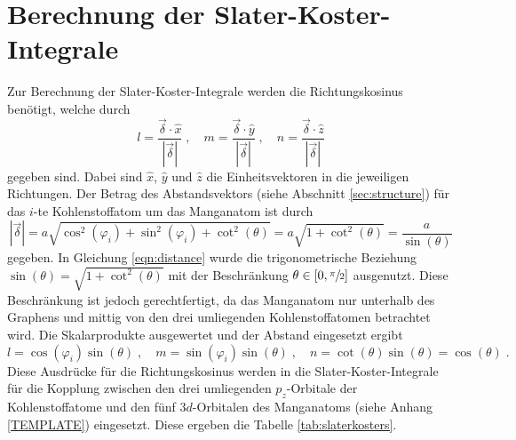 \section{Berechnung der Slater-Koster-Integrale}
\label{sec:slaterkostercalc}
Zur Berechnung der Slater-Koster-Integrale werden die Richtungskosinus benötigt, welche durch
\begin{equation*}
    l = \frac{\vec{\delta} \cdot \hat{x}}{\left | \vec{\delta} \right |} \; , \quad
    m = \frac{\vec{\delta} \cdot \hat{y}}{\left | \vec{\delta} \right |} \; , \quad
    n = \frac{\vec{\delta} \cdot \hat{z}}{\left | \vec{\delta} \right |}
\end{equation*}
gegeben sind.
Dabei sind $\hat{x}$, $\hat{y}$ und $\hat{z}$ die Einheitsvektoren in die jeweiligen Richtungen. 
Der Betrag des Abstandsvektors (siehe Abschnitt \ref{sec:structure}) für das $i$-te Kohlenstoffatom um das Manganatom ist durch 
\begin{equation}
    \left | \vec{\delta} \right | = a \sqrt{\cos^2(\varphi_i) + \sin^2(\varphi_i) + \cot^2(\theta)} = a \sqrt{1+\cot^2(\theta)} = \frac{a}{\sin(\theta)} \label{eqn:distance}
\end{equation}
gegeben.
In Gleichung \eqref{eqn:distance} wurde die trigonometrische Beziehung $\sin(\theta) = \sqrt{1+\cot^2(\theta)}$ \cite{trig} mit der Beschränkung
$\theta \in [ 0, \sfrac{\pi}{2} ] $ ausgenutzt. 
Diese Beschränkung ist jedoch gerechtfertigt, da das Manganatom nur unterhalb des Graphens und mittig von den drei umliegenden Kohlenstoffatomen betrachtet wird.
Die Skalarprodukte ausgewertet und der Abstand eingesetzt ergibt
\begin{equation*}
    l = \cos(\varphi_i) \sin(\theta) \; , \quad
    m = \sin(\varphi_i) \sin(\theta) \; , \quad
    n = \cot(\theta) \sin(\theta) = \cos(\theta) \; .
\end{equation*}
Diese Ausdrücke für die Richtungskosinus werden in die Slater-Koster-Integrale für die Kopplung zwischen den drei umliegenden 
$p_z$-Orbitale der Kohlenstoffatome und den fünf $3d$-Orbitalen des Manganatoms (siehe Anhang \ref{TEMPLATE}) eingesetzt.
Diese ergeben die Tabelle \ref{tab:slaterkosters}.
